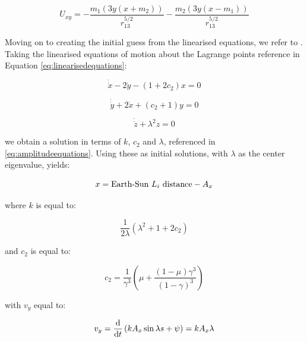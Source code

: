 \begin{equation}
	U_{xy} = -\frac{m_1(3y(x+m_2))}{r_{13}^{5/2}} - \frac{m_2(3y(x-m_1))}{r_{13}^{5/2}}
\end{equation}

Moving on to creating the initial guess from the linearised equations, we refer to \citep{Richardson1980}. Taking the linearised equations of motion about the Lagrange points reference in Equation \ref{eq:linearisedequations}:

\begin{equation}
	\dot{\dot{x}} - 2\dot{y} - (1+2c_2)x = 0
\end{equation}

\begin{equation}
	\dot{\dot{y}} + 2\dot{x} + (c_2+1)y = 0
\end{equation}

\begin{equation}
	\dot{\dot{z}} + \lambda ^2 z = 0
\end{equation}

we obtain a solution in terms of $k$, $c_2$ and $\lambda$, referenced in \ref{eq:amplitudeequations}. Using these as initial solutions, with $\lambda$ as the center eigenvalue, yields:

\begin{equation}
	x = \textnormal{Earth-Sun}~L_i~\textnormal{distance} - A_x
\end{equation}

\noindent where $k$ is equal to:

\begin{equation}
	\frac{1}{2\lambda} \left( \lambda^2 + 1 + 2c_2 \right)
\end{equation}

\noindent and $c_2$ is equal to:

\begin{equation}
	c_2 = \frac{1}{\gamma^3} \left( \mu + \frac{\left( 1 - \mu \right)\gamma ^3}{\left( 1 - \gamma \right)^3} \right)
\end{equation}



\noindent with $v_y$ equal to:

\begin{equation}
	v_y = \frac{\textnormal{d}}{\textnormal{d}t} \left(kA_x\sin{\lambda s + \psi}\right) = kA_x\lambda
\end{equation}



